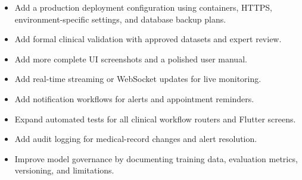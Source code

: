 \begin{itemize}[leftmargin=*]
    \item Add a production deployment configuration using containers, HTTPS, environment-specific settings, and database backup plans.
    \item Add formal clinical validation with approved datasets and expert review.
    \item Add more complete UI screenshots and a polished user manual.
    \item Add real-time streaming or WebSocket updates for live monitoring.
    \item Add notification workflows for alerts and appointment reminders.
    \item Expand automated tests for all clinical workflow routers and Flutter screens.
    \item Add audit logging for medical-record changes and alert resolution.
    \item Improve model governance by documenting training data, evaluation metrics, versioning, and limitations.
\end{itemize}

